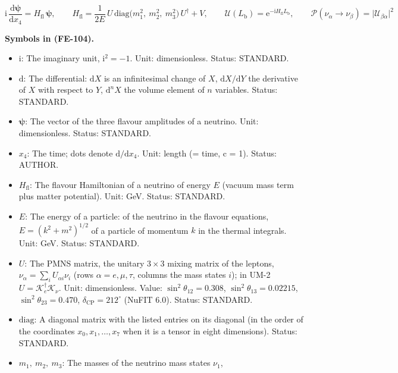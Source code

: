 \documentclass[
  10pt,
]{article}
\providecommand{\tightlist}{%
  \setlength{\itemsep}{0pt}\setlength{\parskip}{0pt}}
\begin{document}
\[
\mathrm{i}\,\frac{\mathrm{d}\boldsymbol{\psi}}{\mathrm{d}x_4} = H_{\mathrm{fl}}\,\boldsymbol{\psi},\qquad
H_{\mathrm{fl}} = \frac{1}{2E}\,U\,\mathrm{diag}\big(m_1^2,\ m_2^2,\ m_3^2\big)\,U^\dagger + V,\qquad
\mathcal{U}(L_{\mathrm{b}}) = \mathrm{e}^{-\mathrm{i}H_{\mathrm{fl}}L_{\mathrm{b}}},\qquad
\mathcal{P}(\nu_\alpha\to\nu_\beta) = \lvert\mathcal{U}_{\beta\alpha}\rvert^2 \tag{FE-104}
\]

\textbf{Symbols in (FE-104).}

\begin{itemize}
\tightlist
\item
  \(\mathrm{i}\): The imaginary unit, \(\mathrm{i}^2 = -1\). Unit:
  dimensionless. Status: STANDARD.
\item
  \(\mathrm{d}\): The differential: \(\mathrm{d}X\) is an infinitesimal
  change of \(X\), \(\mathrm{d}X/\mathrm{d}Y\) the derivative of \(X\)
  with respect to \(Y\), \(\mathrm{d}^nX\) the volume element of \(n\)
  variables. Status: STANDARD.
\item
  \(\boldsymbol{\psi}\): The vector of the three flavour amplitudes of a
  neutrino. Unit: dimensionless. Status: STANDARD.
\item
  \(x_4\): The time; dots denote \(\mathrm{d}/\mathrm{d}x_4\). Unit:
  length (= time, c = 1). Status: AUTHOR.
\item
  \(H_{\mathrm{fl}}\): The flavour Hamiltonian of a neutrino of energy
  \(E\) (vacuum mass term plus matter potential). Unit: GeV. Status:
  STANDARD.
\item
  \(E\): The energy of a particle: of the neutrino in the flavour
  equations, \(E = (k^2 + m^2)^{1/2}\) of a particle of momentum \(k\)
  in the thermal integrals. Unit: GeV. Status: STANDARD.
\item
  \(U\): The PMNS matrix, the unitary \(3 \times 3\) mixing matrix of
  the leptons, \(\nu_\alpha = \sum_iU_{\alpha i}\nu_i\) (rows
  \(\alpha = e, \mu, \tau\), columns the mass states \(i\)); in UM-2
  \(U = \mathcal{K}_e^\dagger\mathcal{K}_\nu\). Unit: dimensionless.
  Value: \(\sin^2\theta_{12} = 0.308\), \(\sin^2\theta_{13} = 0.02215\),
  \(\sin^2\theta_{23} = 0.470\), \(\delta_{\mathrm{CP}} = 212^\circ\)
  (NuFIT 6.0). Status: STANDARD.
\item
  \(\mathrm{diag}\): A diagonal matrix with the listed entries on its
  diagonal (in the order of the coordinates \(x_0, x_1, \dots, x_7\)
  when it is a tensor in eight dimensions). Status: STANDARD.
\item
  \(m_1,\ m_2,\ m_3\): The masses of the neutrino mass states \(\nu_1\),

\end{itemize}
\end{document}
